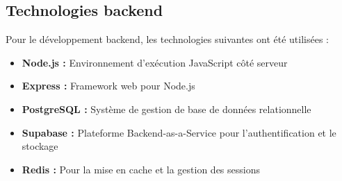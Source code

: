 \subsection{Technologies backend}
Pour le développement backend, les technologies suivantes ont été utilisées :
\begin{itemize}
  \item \textbf{Node.js :} Environnement d'exécution JavaScript côté serveur
  \item \textbf{Express :} Framework web pour Node.js
  \item \textbf{PostgreSQL :} Système de gestion de base de données relationnelle
  \item \textbf{Supabase :} Plateforme Backend-as-a-Service pour l'authentification et le stockage
  \item \textbf{Redis :} Pour la mise en cache et la gestion des sessions
\end{itemize}

